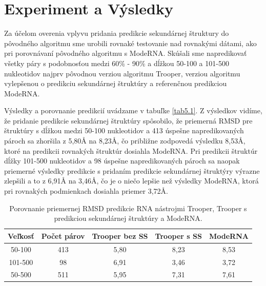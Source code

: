 \section{Experiment a Výsledky}
Za účelom overenia vplyvu pridania predikcie sekundárnej štruktury do pôvodného algoritmu sme urobili rovnaké testovanie nad rovnakými dátami, ako pri porovnávaní pôvodného algoritmu s ModeRNA. Skúšali sme napredikovať všetky páry s podobnosťou medzi 60\% - 90\% a dĺžkou 50-100 a 101-500 nukleotidov najprv pôvodnou verziou algoritmu Trooper, verziou algoritmu vylepšenou o predikciu sekundárnej štruktúry a referenčnou predikciou ModeRNA. 


\indent  Výsledky a porovnanie predikcií uvádzame v tabuľke \autoref{tab5.1}. Z výsledkov vidíme, že pridanie predikcie sekundárnej štruktúry spôsobilo, že priemerná RMSD pre štruktúry s dĺžkou medzi 50-100 nukleotidov a 413 úspešne napredikovaných pároch sa zhoršila z 5,80Å na 8,23Å, čo približne zodpovedá výsledku 8,53Å, ktoré na predikcii rovnakých štruktúr dosiahla ModeRNA. Pri predikcii štruktúr dĺžky 101-500 nukleotidov a 98 úspešne napredikovaných pároch sa naopak priemerné výsledky predikcie s pridaním predikcie sekundárnej štruktýry výrazne zlepšili a to z 6,91Å na 3,46Å, čo je o niečo lepšie než výsledky ModeRNA, ktorá pri rovnakých podmienkach dosiahla priemer 3,72Å. 
\begin{table}[b!]
\centering
\begin{tabular}{ccccc}
\toprule
Veľkosť & Počet párov & Trooper bez SS & Trooper s SS & ModeRNA\\
\midrule
50-100  & 413 & 5,80  & 8,23 & 8,53\\
101-500  & 98 & 6,91  & 3,46 & 3,72\\
\bottomrule
50-500  &  511 & 5,95  & 7,31 & 7,61\\
\end{tabular}
\caption{Porovnanie priemernej RMSD predikcie RNA nástrojmi Trooper, Trooper s predikciou sekundárnej štruktúry a ModeRNA. }\label{tab5.1}
\end{table}


